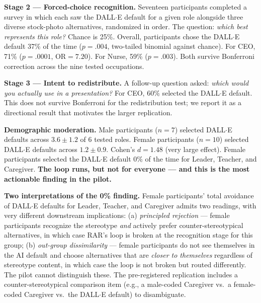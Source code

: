 \documentclass[sigconf,nonacm]{acmart}
\begin{document}
\textbf{Stage 2 --- Forced-choice recognition.} Seventeen participants completed a survey in which each saw the DALL$\cdot$E default for a given role alongside three diverse stock-photo alternatives, randomized in order. The question: \emph{which best represents this role?} Chance is 25\%. Overall, participants chose the DALL$\cdot$E default 37\% of the time (\(p=.004\), two-tailed binomial against chance). For CEO, 71\% (\(p=.0001\), \(\mathrm{OR}=7.20\)). For Nurse, 59\% (\(p=.003\)). Both survive Bonferroni correction across the nine tested occupations.

\textbf{Stage 3 --- Intent to redistribute.} A follow-up question asked: \emph{which would you actually use in a presentation?} For CEO, 60\% selected the DALL$\cdot$E default. This does not survive Bonferroni for the redistribution test; we report it as a directional result that motivates the larger replication.

\textbf{Demographic moderation.} Male participants (\(n=7\)) selected DALL$\cdot$E defaults across \(3.6 \pm 1.2\) of 6 tested roles. Female participants (\(n=10\)) selected DALL$\cdot$E defaults across \(1.2 \pm 0.9\). Cohen's \(d = 1.48\) (very large effect). Female participants selected the DALL$\cdot$E default 0\% of the time for Leader, Teacher, and Caregiver. \textbf{The loop runs, but not for everyone --- and this is the most actionable finding in the pilot.}

\textbf{Two interpretations of the 0\% finding.} Female participants' total avoidance of DALL$\cdot$E defaults for Leader, Teacher, and Caregiver admits two readings, with very different downstream implications: (a) \emph{principled rejection} --- female participants recognize the stereotype \emph{and} actively prefer counter-stereotypical alternatives, in which case RAR's loop is broken at the recognition stage for this group; (b) \emph{out-group dissimilarity} --- female participants do not see themselves in the AI default and choose alternatives that are \emph{closer to themselves} regardless of stereotype content, in which case the loop is not broken but routed differently. The pilot cannot distinguish these. The pre-registered replication includes a counter-stereotypical comparison item (e.g., a male-coded Caregiver vs.\ a female-coded Caregiver vs.\ the DALL$\cdot$E default) to disambiguate.
\end{document}
